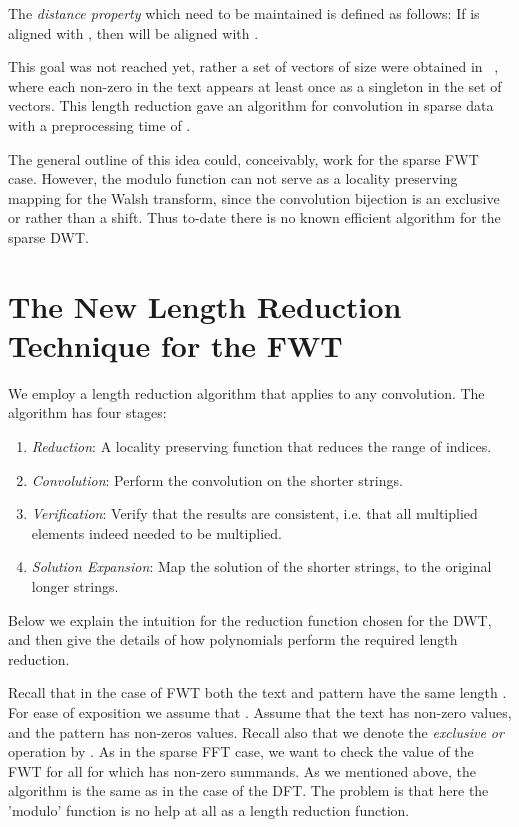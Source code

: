 \documentclass[11pt,amssymb]{article}
\begin{document}
The {\em distance property} which need to be maintained is defined as
follows: If  is aligned with , then
 will be aligned with .

This goal was not reached yet, rather a set of  vectors
of size  were obtained in ~\cite{LR07}, where each
non-zero in the text appears at least once as a singleton in the set
of vectors. This length reduction gave an 
algorithm for convolution in sparse data with a preprocessing time of
.

The general outline of this idea could, conceivably, work for the
sparse FWT case. However, the modulo function can not serve as a
locality preserving mapping for the Walsh transform, since the
convolution bijection is an exclusive or rather than a shift. Thus
to-date there is no known efficient algorithm for the sparse DWT.

\section{The New Length Reduction Technique for the FWT}\label{s:new_fwt}

We employ a length reduction algorithm that applies to any
convolution. The algorithm has four stages:
\begin{enumerate}
\item {\em Reduction}: A locality preserving function that reduces the
  range of indices.
\item {\em Convolution}: Perform the convolution on the shorter
  strings.
\item {\em Verification}: Verify that the results are consistent,
  i.e. that all multiplied elements indeed needed to be
  multiplied. 
\item {\em Solution Expansion}: Map the solution of the shorter
  strings, to the original longer strings.
\end{enumerate}

Below we explain the intuition for the reduction function chosen for
the DWT, and then give the details of how polynomials perform the
required length reduction.

Recall that in the case of FWT both the text and pattern have the same
length . For ease of exposition we assume that . Assume that
the text has  non-zero values, and the pattern has  non-zeros
values. Recall also that we denote the {\em exclusive or} operation by
. As in the sparse FFT case, we want to check the value of the
FWT for all  for which   has 
non-zero summands. As we mentioned above, the algorithm is the same as in the
case of the DFT. The problem is that here the 'modulo' function is no
help at all as a length reduction function. 
\end{document}
